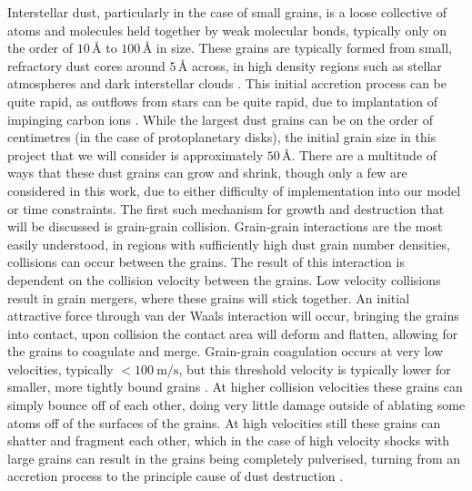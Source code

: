 Interstellar dust, particularly in the case of small grains, is a loose collective of atoms and molecules held together by weak molecular bonds, typically only on the order of $10 \, \si{\angstrom}$ to $100 \, \si{\angstrom}$ in size.
These grains are typically formed from small, refractory dust cores around $5\,\si{\angstrom}$ across, in high density regions such as stellar atmospheres and dark interstellar clouds \parencite{spitzerPhysicalProcessesInterstellar2008}.
This initial accretion process can be quite rapid, as outflows from stars can be quite rapid, due to implantation of impinging carbon ions \parencite{zubkoPhysicalModelDust1998a}.
While the largest dust grains can be on the order of centimetres (in the case of protoplanetary disks), the initial grain size in this project that we will consider is approximately $50 \, \si{\angstrom}$.
There are a multitude of ways that these dust grains can grow and shrink, though only a few are considered in this work, due to either difficulty of implementation into our model or time constraints.
The first such mechanism for growth and destruction that will be discussed is grain-grain collision.
Grain-grain interactions are the most easily understood, in regions with sufficiently high dust grain number densities, collisions can occur between the grains.
The result of this interaction is dependent on the collision velocity between the grains.
Low velocity collisions result in grain mergers, where these grains will stick together.
An initial attractive force through van der Waals interaction will occur, bringing the grains into contact, upon collision the contact area will deform and flatten, allowing for the grains to coagulate and merge.
Grain-grain coagulation occurs at very low velocities, typically $<\SI{100}{\metre\per\second}$, but this threshold velocity is typically lower for smaller, more tightly bound grains
\parencite{chokshiDustCoagulation1993}.
At higher collision velocities these grains can simply bounce off of each other, doing very little damage outside of ablating some atoms off of the surfaces of the grains.
At high velocities still these grains can shatter and fragment each other, which in the case of high velocity shocks with large grains can result in the grains being completely pulverised, turning from an accretion process to the principle cause of dust destruction
\parencite{jonesGrainShatteringShocks1996,jonesDustDestructionProcesses2004}.

